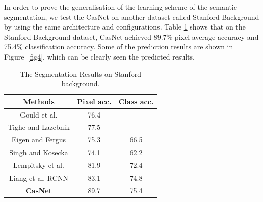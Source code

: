 \documentclass[10.5pt,compsoc]{TsT}
\newcommand{\upcite}[1]{\superscript{\textsuperscript{\cite{#1}}}}
\theoremstyle{mystyle}
\newcommand{\upcite}[1]{\textsuperscript{\cite{#1}}}
\begin{document}
{In order to prove the generalisation of the learning scheme of the semantic segmentation, we test the CasNet on another dataset called Stanford Background by using the same architecture and configurations. Table \ref{table2} shows that on the Stanford Background dataset, CasNet achieved 89.7\% pixel average accuracy and 75.4\% classification accuracy. Some of the prediction results are shown in Figure~\ref{fig4}, which can be clearly seen the predicted results.

\begin{table}[h]
\large
\setlength{\belowcaptionskip}{12pt}
\caption{The Segmentation Results on Stanford background.}
\label{table2}
\centering
\begin{tabular}{ccc}
\hline 
Methods & Pixel acc. & Class acc. \\
\hline
Gould et al.\upcite{7} & 76.4 & - \\
Tighe and Lazebnik\upcite{25} & 77.5 & - \\
Eigen and Fergus\upcite{28} & 75.3 & 66.5 \\
Singh and Kosecka\upcite{27} & 74.1 & 62.2 \\
Lempitsky et al.\upcite{10} & 81.9 & 72.4 \\
Liang et al. RCNN\upcite{24} & 83.1 & 74.8 \\
\textbf{CasNet} & 89.7 & 75.4 \\
\hline
\end{tabular}
\end{table}

}
\end{document}
